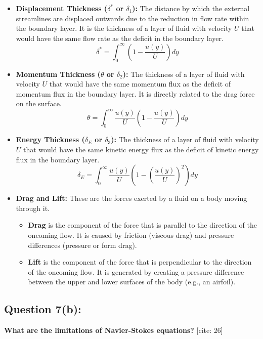 \documentclass{article}
\begin{document}
\begin{itemize}
    \item \textbf{Displacement Thickness ($\delta^*$ or $\delta_1$):} The distance by which the external streamlines are displaced outwards due to the reduction in flow rate within the boundary layer. It is the thickness of a layer of fluid with velocity $U$ that would have the same flow rate as the deficit in the boundary layer.
    $$ \delta^* = \int_0^\infty \left(1 - \frac{u(y)}{U}\right) dy $$
    \item \textbf{Momentum Thickness ($\theta$ or $\delta_2$):} The thickness of a layer of fluid with velocity $U$ that would have the same momentum flux as the deficit of momentum flux in the boundary layer. It is directly related to the drag force on the surface.
    $$ \theta = \int_0^\infty \frac{u(y)}{U}\left(1 - \frac{u(y)}{U}\right) dy $$
    \item \textbf{Energy Thickness ($\delta_E$ or $\delta_3$):} The thickness of a layer of fluid with velocity $U$ that would have the same kinetic energy flux as the deficit of kinetic energy flux in the boundary layer.
    $$ \delta_E = \int_0^\infty \frac{u(y)}{U}\left(1 - \left(\frac{u(y)}{U}\right)^2\right) dy $$
    \item \textbf{Drag and Lift:} These are the forces exerted by a fluid on a body moving through it.
    \begin{itemize}
        \item \textbf{Drag} is the component of the force that is parallel to the direction of the oncoming flow. It is caused by friction (viscous drag) and pressure differences (pressure or form drag).
        \item \textbf{Lift} is the component of the force that is perpendicular to the direction of the oncoming flow. It is generated by creating a pressure difference between the upper and lower surfaces of the body (e.g., an airfoil).
    \end{itemize}
\end{itemize}
\hrulefill

\subsection*{\textbf{Question 7(b):}}
\textbf{What are the limitations of Navier-Stokes equations?} [cite: 26]
\end{document}
